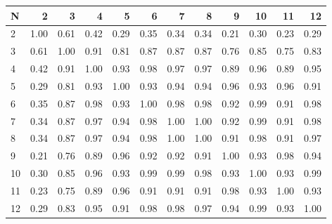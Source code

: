 \begin{tabular}{lrrrrrrrrrrr}
\toprule
N &    2  &    3  &    4  &    5  &    6  &    7  &    8  &    9  &    10 &    11 &    12 \\
\midrule
2  &  1.00 &  0.61 &  0.42 &  0.29 &  0.35 &  0.34 &  0.34 &  0.21 &  0.30 &  0.23 &  0.29 \\
3  &  0.61 &  1.00 &  0.91 &  0.81 &  0.87 &  0.87 &  0.87 &  0.76 &  0.85 &  0.75 &  0.83 \\
4  &  0.42 &  0.91 &  1.00 &  0.93 &  0.98 &  0.97 &  0.97 &  0.89 &  0.96 &  0.89 &  0.95 \\
5  &  0.29 &  0.81 &  0.93 &  1.00 &  0.93 &  0.94 &  0.94 &  0.96 &  0.93 &  0.96 &  0.91 \\
6  &  0.35 &  0.87 &  0.98 &  0.93 &  1.00 &  0.98 &  0.98 &  0.92 &  0.99 &  0.91 &  0.98 \\
7  &  0.34 &  0.87 &  0.97 &  0.94 &  0.98 &  1.00 &  1.00 &  0.92 &  0.99 &  0.91 &  0.98 \\
8  &  0.34 &  0.87 &  0.97 &  0.94 &  0.98 &  1.00 &  1.00 &  0.91 &  0.98 &  0.91 &  0.97 \\
9  &  0.21 &  0.76 &  0.89 &  0.96 &  0.92 &  0.92 &  0.91 &  1.00 &  0.93 &  0.98 &  0.94 \\
10 &  0.30 &  0.85 &  0.96 &  0.93 &  0.99 &  0.99 &  0.98 &  0.93 &  1.00 &  0.93 &  0.99 \\
11 &  0.23 &  0.75 &  0.89 &  0.96 &  0.91 &  0.91 &  0.91 &  0.98 &  0.93 &  1.00 &  0.93 \\
12 &  0.29 &  0.83 &  0.95 &  0.91 &  0.98 &  0.98 &  0.97 &  0.94 &  0.99 &  0.93 &  1.00 \\
\bottomrule
\end{tabular}
